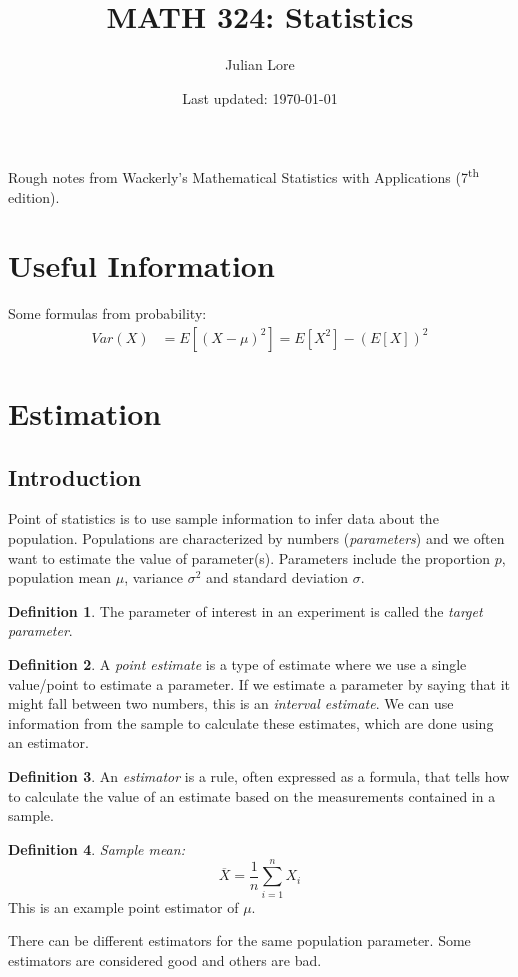 \documentclass[12 pt]{article}
\author{Julian Lore}
\date{Last updated: \today}
\title{MATH 324: Statistics}
\theoremstyle{definition}
\newtheorem{defn}{Definition}
\begin{document}
	\onehalfspacing
	\maketitle
	Rough notes from Wackerly's Mathematical Statistics with
        Applications (7\textsuperscript{th} edition).
	\tableofcontents
        \section*{Useful Information}
        Some formulas from probability:
        \begin{align*}
          Var(X) & = E[(X-\mu)^2] = E[X^2] - (E[X])^2
        \end{align*}
        \setcounter{section}{7}
        \section{Estimation}
        \subsection{Introduction}
        Point of statistics is to use sample information to infer data
        about the population. Populations are characterized by numbers
        (\textit{parameters}) and we often want to estimate the value
        of parameter(s). Parameters include the proportion $p$,
        population mean $\mu$, variance $\sigma^2$ and standard
        deviation $\sigma$.
        \begin{defn}
          The parameter of interest in an experiment is called the
          \textit{target parameter}.
        \end{defn}
        \begin{defn}
          A \textit{point estimate} is a type of estimate where we use
          a single value/point to estimate a parameter. If we estimate
          a parameter by saying that it might fall between two
          numbers, this is an \textit{interval estimate}. We can use
          information from the sample to calculate these estimates,
          which are done using an estimator.
        \end{defn}
        \begin{defn}
          An \textit{estimator} is a rule, often expressed as a
          formula, that tells how to calculate the value of an
          estimate based on the measurements contained in a sample.
        \end{defn}
        \begin{defn}
          \textit{Sample mean:}
          $$\overline{X} = \frac{1}{n} \sum_{i=1}^n X_i$$ This is an
          example point estimator of $\mu$.
        \end{defn}
        There can be different estimators for the same population
        parameter. Some estimators are considered good and others are bad.
\end{document}
